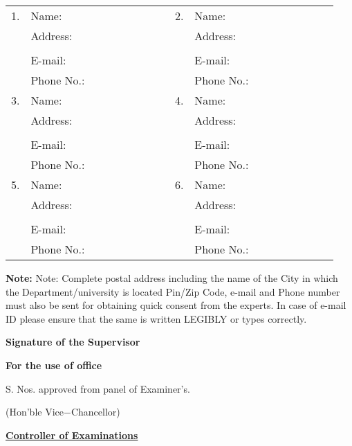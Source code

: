 \begin{table}[!htp] 
\centering 
\setlength{\tabcolsep}{3pt} {\renewcommand{\arraystretch}{1}%
\label{tab:Examiners} 
\begin{tabular}{|p{0.02\linewidth}|p{0.45\linewidth}|p{0.02\linewidth}|p{0.45\linewidth}|} \hline 
1. & Name: & 2. & Name: \\  & Address: & & Address: \\ &&&
\\  & E-mail: & & E-mail: \\  & Phone No.: & & Phone No.: \\ \hline 
3. & Name: & 4. & Name: \\ & Address: & & Address: \\ &&&
\\ & E-mail: & & E-mail: \\  & Phone No.: & & Phone No.: \\ \hline 
5. & Name: & 6. & Name: \\  & Address: & & Address: \\ &&&
\\ & E-mail: & & E-mail: \\  & Phone No.: & & Phone No.: \\ \hline 
\end{tabular}} 
\end{table}
\vspace{-.45cm} 
\textbf{Note:} Note: Complete postal address including the name of the City in which the
Department/university is located Pin/Zip Code, e-mail and Phone number must also be sent for
obtaining quick consent from the experts. In case of e-mail ID please ensure that the same is
written LEGIBLY or types correctly.\vspace{.15cm} 
 \begin{flushright} 
 \textbf{Signature of the Supervisor} \\ \vspace{-.5cm}  
 \underline{\hspace{14.5cm}} 
 \end{flushright} \vspace{-.5cm} 
\begin{center}
\textbf{For the use of office}
\end{center}
\vspace{-.25cm} 
S. Nos. \underline{\hspace{4.5cm}}  approved from panel of Examiner's.\\ \vspace{-.45cm} 
\begin{flushright}
(Hon'ble Vice$-$Chancellor)
\end{flushright} \vspace{-.25cm} 
\textbf{\uline{Controller of Examinations}}
